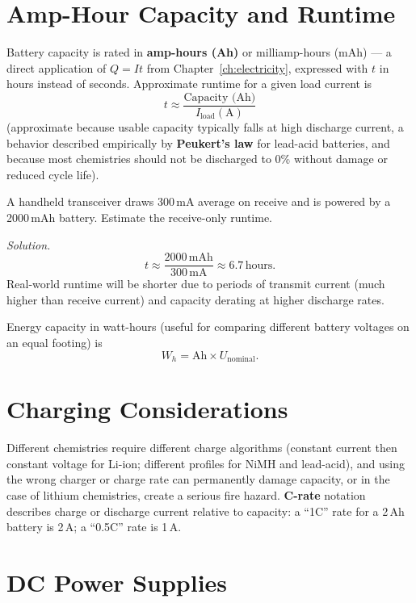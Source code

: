 \section{Amp-Hour Capacity and Runtime}

Battery capacity is rated in \textbf{amp-hours (Ah)} or milliamp-hours
(mAh) --- a direct application of $Q = It$ from
Chapter~\ref{ch:electricity}, expressed with $t$ in hours instead of
seconds. Approximate runtime for a given load current is
\[
t \approx \frac{\text{Capacity (Ah)}}{I_{\text{load}} (\text{A})}
\]
(approximate because usable capacity typically falls at high discharge
current, a behavior described empirically by \textbf{Peukert's law} for
lead-acid batteries, and because most chemistries should not be
discharged to 0\% without damage or reduced cycle life).

\begin{examplebox}
A handheld transceiver draws 300\,mA average on receive and is powered
by a 2000\,mAh battery. Estimate the receive-only runtime.

\emph{Solution.}
\[
t \approx \frac{2000\,\text{mAh}}{300\,\text{mA}} \approx 6.7\,\text{hours}.
\]
Real-world runtime will be shorter due to periods of transmit current
(much higher than receive current) and capacity derating at higher
discharge rates.
\end{examplebox}

Energy capacity in watt-hours (useful for comparing different battery
voltages on an equal footing) is
\[
W_h = \text{Ah} \times U_{\text{nominal}}.
\]

\section{Charging Considerations}

Different chemistries require different charge algorithms (constant
current then constant voltage for Li-ion; different profiles for NiMH
and lead-acid), and using the wrong charger or charge rate can
permanently damage capacity, or in the case of lithium chemistries,
create a serious fire hazard. \textbf{C-rate} notation describes charge
or discharge current relative to capacity: a ``1C'' rate for a 2\,Ah
battery is 2\,A; a ``0.5C'' rate is 1\,A.

\section{DC Power Supplies}

